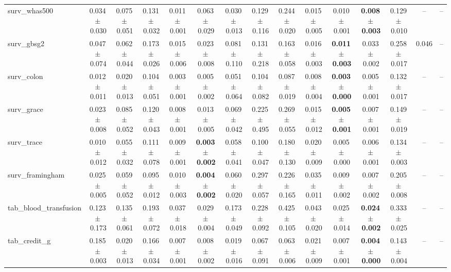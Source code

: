 \documentclass[8pt]{extarticle}
\begin{document}
\begin{longtable}{l*{14}{c}}
surv\_whas500 & 0.034\,$\pm$\,0.030 & 0.075\,$\pm$\,0.051 & 0.131\,$\pm$\,0.032 & 0.011\,$\pm$\,0.001 & 0.063\,$\pm$\,0.029 & 0.030\,$\pm$\,0.013 & 0.129\,$\pm$\,0.116 & 0.244\,$\pm$\,0.020 & 0.015\,$\pm$\,0.005 & 0.010\,$\pm$\,0.001 & \textbf{0.008\,$\pm$\,0.003} & 0.129\,$\pm$\,0.010 & -- & -- \\
surv\_gbsg2 & 0.047\,$\pm$\,0.074 & 0.062\,$\pm$\,0.044 & 0.173\,$\pm$\,0.026 & 0.015\,$\pm$\,0.006 & 0.023\,$\pm$\,0.008 & 0.081\,$\pm$\,0.110 & 0.131\,$\pm$\,0.218 & 0.163\,$\pm$\,0.058 & 0.016\,$\pm$\,0.003 & \textbf{0.011\,$\pm$\,0.003} & 0.033\,$\pm$\,0.002 & 0.258\,$\pm$\,0.017 & 0.046 & -- \\
surv\_colon & 0.012\,$\pm$\,0.011 & 0.020\,$\pm$\,0.013 & 0.104\,$\pm$\,0.051 & 0.003\,$\pm$\,0.001 & 0.005\,$\pm$\,0.002 & 0.051\,$\pm$\,0.064 & 0.104\,$\pm$\,0.082 & 0.087\,$\pm$\,0.019 & 0.008\,$\pm$\,0.004 & \textbf{0.003\,$\pm$\,0.000} & 0.005\,$\pm$\,0.001 & 0.132\,$\pm$\,0.017 & -- & -- \\
surv\_grace & 0.023\,$\pm$\,0.008 & 0.085\,$\pm$\,0.052 & 0.120\,$\pm$\,0.043 & 0.008\,$\pm$\,0.001 & 0.013\,$\pm$\,0.005 & 0.069\,$\pm$\,0.042 & 0.225\,$\pm$\,0.495 & 0.269\,$\pm$\,0.055 & 0.015\,$\pm$\,0.012 & \textbf{0.005\,$\pm$\,0.001} & 0.007\,$\pm$\,0.001 & 0.149\,$\pm$\,0.019 & -- & -- \\
surv\_trace & 0.010\,$\pm$\,0.012 & 0.055\,$\pm$\,0.032 & 0.111\,$\pm$\,0.078 & 0.009\,$\pm$\,0.001 & \textbf{0.003\,$\pm$\,0.002} & 0.058\,$\pm$\,0.041 & 0.100\,$\pm$\,0.047 & 0.180\,$\pm$\,0.130 & 0.020\,$\pm$\,0.009 & 0.005\,$\pm$\,0.000 & 0.006\,$\pm$\,0.001 & 0.134\,$\pm$\,0.003 & -- & -- \\
surv\_framingham & 0.025\,$\pm$\,0.005 & 0.059\,$\pm$\,0.052 & 0.095\,$\pm$\,0.012 & 0.010\,$\pm$\,0.003 & \textbf{0.004\,$\pm$\,0.002} & 0.060\,$\pm$\,0.020 & 0.297\,$\pm$\,0.057 & 0.226\,$\pm$\,0.165 & 0.035\,$\pm$\,0.011 & 0.009\,$\pm$\,0.002 & 0.007\,$\pm$\,0.002 & 0.205\,$\pm$\,0.008 & -- & -- \\
tab\_blood\_transfusion & 0.123\,$\pm$\,0.173 & 0.135\,$\pm$\,0.061 & 0.193\,$\pm$\,0.072 & 0.037\,$\pm$\,0.018 & 0.029\,$\pm$\,0.004 & 0.173\,$\pm$\,0.049 & 0.228\,$\pm$\,0.092 & 0.425\,$\pm$\,0.105 & 0.043\,$\pm$\,0.020 & 0.025\,$\pm$\,0.014 & \textbf{0.024\,$\pm$\,0.002} & 0.333\,$\pm$\,0.025 & -- & -- \\
tab\_credit\_g & 0.185\,$\pm$\,0.003 & 0.020\,$\pm$\,0.013 & 0.166\,$\pm$\,0.034 & 0.007\,$\pm$\,0.001 & 0.008\,$\pm$\,0.002 & 0.019\,$\pm$\,0.016 & 0.067\,$\pm$\,0.091 & 0.063\,$\pm$\,0.006 & 0.021\,$\pm$\,0.009 & 0.007\,$\pm$\,0.001 & \textbf{0.004\,$\pm$\,0.000} & 0.143\,$\pm$\,0.004 & -- & -- \\

\end{longtable}
\end{document}
